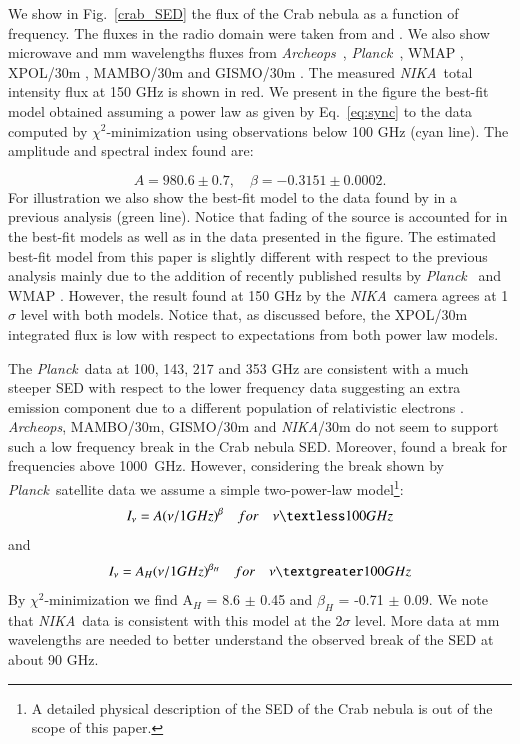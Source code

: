 \documentclass[twocolumn,traditabstract]{aa}
\def\NIKA{\textit{NIKA}}
\def\Archeops{\textit{Archeops}}
\def\Planck{\textit{Planck}}
\begin{document}
We show in Fig.~\ref{crab_SED} the flux of the Crab nebula as a function of frequency. The fluxes in the radio domain were taken from \cite{dmitrenko1970absolute} and \cite{1971IzVUZ..14..157V}. We also show microwave and mm wavelengths fluxes from \Archeops\ \citep{macias2007archeops}, \Planck\ \citep{2015arXiv150702058P}, WMAP \citep{2011ApJS..192...19W}, XPOL/30m \citep{aumont2010}, MAMBO/30m \citep{2002A&A...386.1044B} and GISMO/30m \citep{2011ApJ...734...54A}. The measured \NIKA\ total intensity flux at 150 GHz is shown in red.
We present in the figure the best-fit model obtained assuming a power law as given by Eq.~\ref{eq:sync} to the data computed by $\chi^2$-minimization using observations below 100 GHz (cyan line). The amplitude and spectral index found are: 

\begin{equation}
 A = 980.6 \pm 0.7  ,\quad \beta = -0.3151 \pm 0.0002. 
 \end{equation}
 For illustration we also show the best-fit model to the data found by \cite{macias2010} in a previous analysis (green line). 
Notice that fading of the source is accounted for in the best-fit models as well as in the data presented in the figure.
The estimated best-fit model from this paper is slightly different with respect to the previous analysis mainly due to the addition of recently published results by \Planck\ \citep{2015arXiv150702058P} and  WMAP \citep{2011ApJS..192...19W}. However, the result found at 150 GHz by the \NIKA\ camera agrees at 1 $\sigma$ level with both models. 
Notice that, as discussed before, the XPOL/30m integrated flux is low with respect to expectations from both power law models. 
 
The \Planck\ data at 100, 143, 217 and 353 GHz are consistent with a much
steeper SED with respect to the lower frequency data suggesting an extra emission component due to a different
population of relativistic electrons \citep{1965ARA&A...3..297G, 2012ApJ...760...96G}. 
{\it Archeops}, MAMBO/30m, GISMO/30m
and \NIKA/30m do not seem to support such a low frequency break in the Crab nebula
SED. Moreover, \cite{macias2010} found a break for frequencies above 1000~GHz. 
However, considering the break shown by \Planck\ satellite data we assume a simple
two-power-law model\footnote{A detailed physical description of the SED of the
  Crab nebula is out of the scope of this paper.}:
\begin{equation}
I_{\nu} = A(\nu/1GHz)^{\beta} \quad for \quad \nu   \textless  100 GHz
\end{equation}
and 
\begin{equation}
I_{\nu} = A_{H}(\nu/1GHz)^{\beta_H} \quad for \quad \nu   \textgreater  100 GHz
\end{equation}
By $\chi^2$-minimization we find
A$_H$ = 8.6 $\pm$ 0.45 and $\beta_H$ = -0.71 $\pm$ 0.09.
We note that \NIKA\ data is consistent with this model at the 2$\sigma$ level. More data at mm wavelengths are needed to better understand the observed break of the SED at about 90 GHz. 
\end{document}
